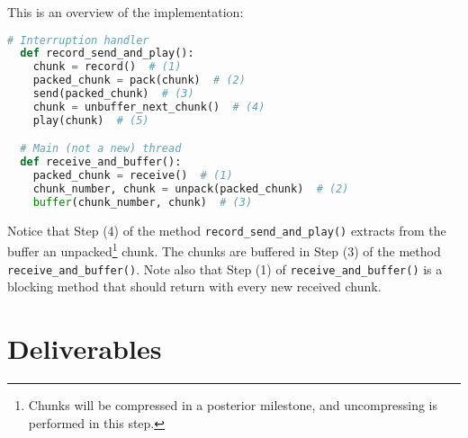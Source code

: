 This is an overview of the implementation:

\begin{lstlisting}[language=Python]
  # Interruption handler
  def record_send_and_play():
    chunk = record()  # (1)
    packed_chunk = pack(chunk)  # (2)
    send(packed_chunk)  # (3)
    chunk = unbuffer_next_chunk()  # (4)
    play(chunk)  # (5)

  # Main (not a new) thread
  def receive_and_buffer():
    packed_chunk = receive()  # (1)
    chunk_number, chunk = unpack(packed_chunk)  # (2)
    buffer(chunk_number, chunk)  # (3)
\end{lstlisting}

Notice that Step (4) of the method \verb|record_send_and_play()|
extracts from the buffer an unpacked\footnote{Chunks will be
compressed in a posterior milestone, and uncompressing is performed in
this step.} chunk. The chunks are buffered in Step (3) of the
method \verb|receive_and_buffer()|. Note also that Step (1) of
\verb|receive_and_buffer()| is a blocking method that should return with
every new received chunk.


\section{Deliverables}
\label{sec:homework}

